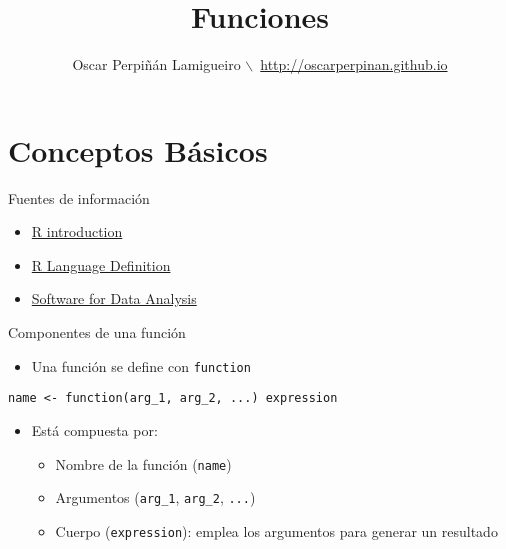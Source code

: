\documentclass[xcolor={usenames,svgnames,dvipsnames}]{beamer}
\author{Oscar Perpiñán Lamigueiro $\backslash$\ \url{http://oscarperpinan.github.io}}
\date{}
\title{Funciones}
\begin{document}
\maketitle


\section{Conceptos Básicos}
\label{sec:orgdf7c3d3}

\begin{frame}[label={sec:org1c1630f}]{Fuentes de información}
\begin{itemize}
\item \href{http://cran.r-project.org/doc/manuals/R-intro.html}{R introduction}
\item \href{http://cran.r-project.org/doc/manuals/R-lang.html}{R Language Definition}
\item \href{http://www.springer.com/gb/book/9780387759357}{Software for Data Analysis}
\end{itemize}
\end{frame}
\begin{frame}[fragile,label={sec:org882aa46}]{Componentes de una función}
 \begin{itemize}
\item Una función se define con \texttt{function}
\end{itemize}
\begin{center}
\texttt{name <- function(arg\_1, arg\_2, ...) expression}
\end{center}
\begin{itemize}
\item Está compuesta por:
\begin{itemize}
\item Nombre de la función (\texttt{name})
\item Argumentos (\texttt{arg\_1}, \texttt{arg\_2}, \texttt{...})
\item Cuerpo (\texttt{expression}): emplea los argumentos para generar un resultado
\end{itemize}
\end{itemize}
\end{frame}
\end{document}
